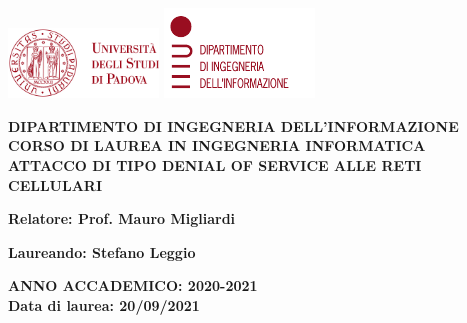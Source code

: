 \begin{titlepage}
  \begin{center}
    \includegraphics[width=0.3\textwidth]{images/unipd.png}
    \hfill
    \includegraphics[width=0.3\textwidth]{images/dei.png}
  \end{center}
  \begin{center}
    \vspace{3cm}
    \large
    \MakeUppercase{
      \textbf{
        Dipartimento di ingegneria dell'informazione\\
        \vspace{0.5cm}
        Corso di laurea in Ingegneria Informatica\\
      }
    }
    \vspace{5cm}
    \MakeUppercase{
      \textbf{
        Attacco di tipo Denial of Service alle reti cellulari\\
      }
    }
    \vspace{5cm}
    \begin{flushleft}
      \textbf{
        Relatore: Prof. Mauro Migliardi\\
      }
    \end{flushleft}
    \vspace{1cm}
    \begin{flushright}
      \textbf{
        Laureando: Stefano Leggio\\
      }
    \end{flushright}
    \vspace{2cm}
    \MakeUppercase{
      \textbf{
        Anno accademico: 2020-2021\\
      }
    }
    \vspace{0.5cm}
    \textbf{
      Data di laurea: 20/09/2021
    }
  \end{center}
\end{titlepage}